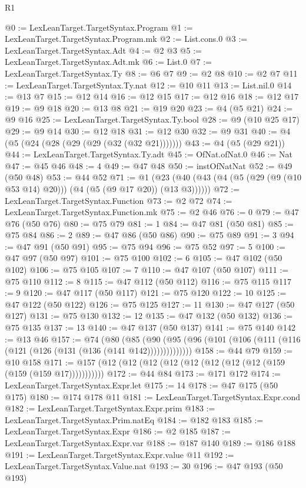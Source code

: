 \begin{lexlean}{R1}
\begin{coremodule}
@0 := LexLeanTarget.TargetSyntax.Program
@1 := LexLeanTarget.TargetSyntax.Program.mk
@2 := List.cons.{0}
@3 := LexLeanTarget.TargetSyntax.Adt
@4 := @2 @3
@5 := LexLeanTarget.TargetSyntax.Adt.mk
@6 := List.{0}
@7 := LexLeanTarget.TargetSyntax.Ty
@8 := @6 @7
@9 := @2 @8
@10 := @2 @7
@11 := LexLeanTarget.TargetSyntax.Ty.nat
@12 := @10 @11
@13 := List.nil.{0}
@14 := @13 @7
@15 := @12 @14
@16 := @12 @15
@17 := @12 @16
@18 := @12 @17
@19 := @9 @18
@20 := @13 @8
@21 := @19 @20
@23 := @4 (@5 @21)
@24 := @9 @16
@25 := LexLeanTarget.TargetSyntax.Ty.bool
@28 := @9 (@10 @25 @17)
@29 := @9 @14
@30 := @12 @18
@31 := @12 @30
@32 := @9 @31
@40 := @4 (@5 (@24 (@28 (@29 (@29 (@32 (@32 @21)))))))
@43 := @4 (@5 (@29 @21))
@44 := LexLeanTarget.TargetSyntax.Ty.adt
@45 := OfNat.ofNat.{0}
@46 := Nat
@47 := @45 @46
@48 := 4
@49 := @47 @48
@50 := instOfNatNat
@52 := @49 (@50 @48)
@53 := @44 @52
@71 := @1 (@23 (@40 (@43 (@4 (@5 (@29 (@9 (@10 @53 @14) @20))) (@4 (@5 (@9 @17 @20)) (@13 @3))))))
@72 := LexLeanTarget.TargetSyntax.Function
@73 := @2 @72
@74 := LexLeanTarget.TargetSyntax.Function.mk
@75 := @2 @46
@76 := 0
@79 := @47 @76 (@50 @76)
@80 := @75 @79
@81 := 1
@84 := @47 @81 (@50 @81)
@85 := @75 @84
@86 := 2
@89 := @47 @86 (@50 @86)
@90 := @75 @89
@91 := 3
@94 := @47 @91 (@50 @91)
@95 := @75 @94
@96 := @75 @52
@97 := 5
@100 := @47 @97 (@50 @97)
@101 := @75 @100
@102 := 6
@105 := @47 @102 (@50 @102)
@106 := @75 @105
@107 := 7
@110 := @47 @107 (@50 @107)
@111 := @75 @110
@112 := 8
@115 := @47 @112 (@50 @112)
@116 := @75 @115
@117 := 9
@120 := @47 @117 (@50 @117)
@121 := @75 @120
@122 := 10
@125 := @47 @122 (@50 @122)
@126 := @75 @125
@127 := 11
@130 := @47 @127 (@50 @127)
@131 := @75 @130
@132 := 12
@135 := @47 @132 (@50 @132)
@136 := @75 @135
@137 := 13
@140 := @47 @137 (@50 @137)
@141 := @75 @140
@142 := @13 @46
@157 := @74
    (@80
      (@85 (@90 (@95 (@96 (@101 (@106 (@111 (@116 (@121 (@126 (@131 (@136 (@141 @142))))))))))))))
@158 := @44 @79
@159 := @10 @158
@171 := @157 (@12 (@12 (@12 (@12 (@12 (@12 (@12 (@12 (@159 (@159 (@159 @17)))))))))))
@172 := @44 @84
@173 := @171 @172
@174 := LexLeanTarget.TargetSyntax.Expr.let
@175 := 14
@178 := @47 @175 (@50 @175)
@180 := @174 @178 @11
@181 := LexLeanTarget.TargetSyntax.Expr.cond
@182 := LexLeanTarget.TargetSyntax.Expr.prim
@183 := LexLeanTarget.TargetSyntax.Prim.natEq
@184 := @182 @183
@185 := LexLeanTarget.TargetSyntax.Expr
@186 := @2 @185
@187 := LexLeanTarget.TargetSyntax.Expr.var
@188 := @187 @140
@189 := @186 @188
@191 := LexLeanTarget.TargetSyntax.Expr.value @11
@192 := LexLeanTarget.TargetSyntax.Value.nat
@193 := 30
@196 := @47 @193 (@50 @193)

\end{coremodule}
\end{lexlean}
